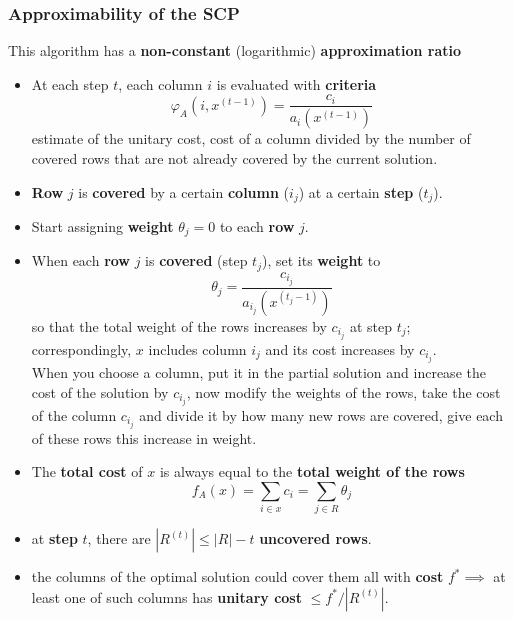 \documentclass[11pt]{article}
\begin{document}
	\subsubsection{Approximability of the SCP}
	This algorithm has a \textbf{non-constant} (logarithmic) \textbf{approximation ratio}
	\begin{itemize}
		\item At each step $t$, each column $i$ is evaluated with \textbf{criteria}
		$$ \varphi_A \left(i, x^{(t-1)}\right) = \frac{c_i}{a_i \left(x^{(t-1)}\right)} $$
		estimate of the unitary cost, cost of a column divided by the number of covered rows that are not already covered by the current solution.\\
		
		\item \textbf{Row} $j$ is \textbf{covered} by a certain \textbf{column} ($i_j$) at a certain \textbf{step} ($t_j$).\\
		
		\item Start assigning \textbf{weight} $\theta_j = 0$ to each \textbf{row} $j$.\\
		
		\item When each \textbf{row} $j$ is \textbf{covered} (step $t_j$), set its \textbf{weight} to
		$$ \theta_j = \frac{c_{i_j}}{a_{i_j} \left(x^{(t_j - 1)}\right)}$$
		so that the total weight of the rows increases by $c_{i_j}$ at step $t_j$; correspondingly, $x$ includes column $i_j$ and its cost increases by $c_{i_j}$.\\
		When you choose a column, put it in the partial solution and increase the cost of the solution by $c_{i_j}$, now modify the weights of the rows, take the cost of the column $c_{i_j}$ and divide it by how many new rows are covered, give each of these rows this increase in weight.\\
		
		\item The \textbf{total cost} of $x$ is always equal to the \textbf{total weight of the rows}
		$$ f_A (x) = \sum_{i \in x} c_i = \sum_{j \in R} \theta_j $$
		\nn
		
		\item at \textbf{step} $t$, there are $|R^{(t)}| \leq |R| − t$ \textbf{uncovered rows}.\\
		
		\newpage
		
		\item the columns of the optimal solution could cover them all with \textbf{cost} $f^\ast \implies$ at least one of such columns has \textbf{unitary cost} $\leq f^\ast /|R^{(t)}|$.\\
		

\end{itemize}
\end{document}
